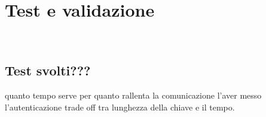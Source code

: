 \chapter{Test e validazione}
\label{cap:test}

\\

\section{Test svolti???}
quanto tempo serve per quanto rallenta la comunicazione l'aver messo l'autenticazione
trade off tra lunghezza della chiave e il tempo.